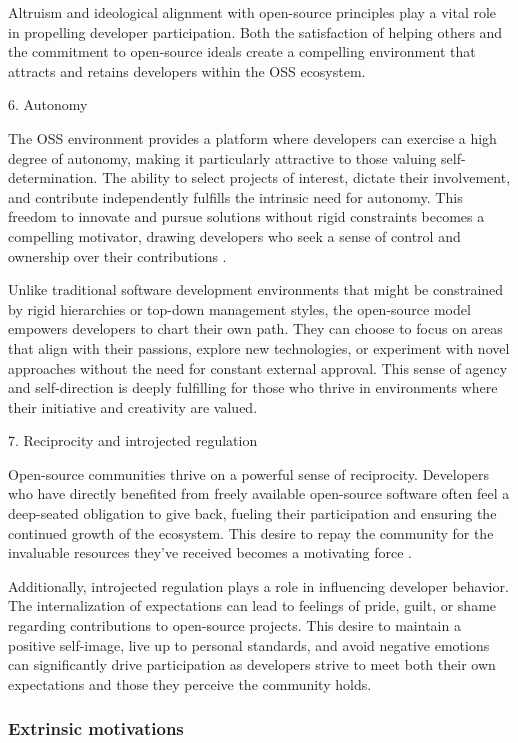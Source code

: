 Altruism and ideological alignment with open-source principles play a vital role in propelling developer participation. Both the satisfaction of helping others and the commitment to open-source ideals create a compelling environment that attracts and retains developers within the OSS ecosystem.

6. Autonomy

The OSS environment provides a platform where developers can exercise a high degree of autonomy, making it particularly attractive to those valuing self-determination. The ability to select projects of interest, dictate their involvement, and contribute independently fulfills the intrinsic need for autonomy. This freedom to innovate and pursue solutions without rigid constraints becomes a compelling motivator, drawing developers who seek a sense of control and ownership over their contributions \citep{16ke2008motivations}.

Unlike traditional software development environments that might be constrained by rigid hierarchies or top-down management styles, the open-source model empowers developers to chart their own path. They can choose to focus on areas that align with their passions, explore new technologies, or experiment with novel approaches without the need for constant external approval.  This sense of agency and self-direction is deeply fulfilling for those who thrive in environments where their initiative and creativity are valued.

7. Reciprocity and introjected regulation

Open-source communities thrive on a powerful sense of reciprocity. Developers who have directly benefited from freely available open-source software often feel a deep-seated obligation to give back, fueling their participation and ensuring the continued growth of the ecosystem. This desire to repay the community for the invaluable resources they've received becomes a motivating force \citep{11gerosa2021shifting,13li2012leadership}.

Additionally, introjected regulation plays a role in influencing developer behavior. The internalization of expectations can lead to feelings of pride, guilt, or shame regarding contributions to open-source projects. This desire to maintain a positive self-image, live up to personal standards, and avoid negative emotions can significantly drive participation as developers strive to meet both their own expectations and those they perceive the community holds.

\subsubsection{Extrinsic motivations}

